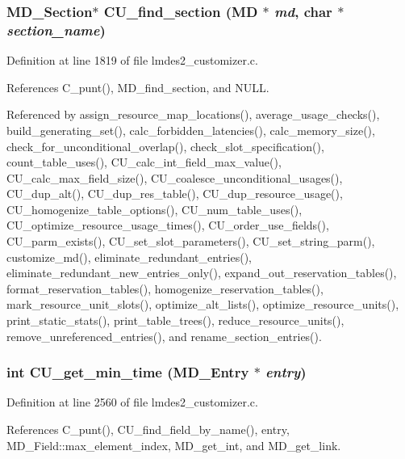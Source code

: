 \subsubsection{\setlength{\rightskip}{0pt plus 5cm}\bf{MD\_\-Section}$\ast$ CU\_\-find\_\-section (\bf{MD} $\ast$ {\em md}, char $\ast$ {\em section\_\-name})}\label{lmdes2__customizer_8c_5b29c261eac5c2802f9c5ef741c7ef12}




Definition at line 1819 of file lmdes2\_\-customizer.c.

References C\_\-punt(), MD\_\-find\_\-section, and NULL.

Referenced by assign\_\-resource\_\-map\_\-locations(), average\_\-usage\_\-checks(), build\_\-generating\_\-set(), calc\_\-forbidden\_\-latencies(), calc\_\-memory\_\-size(), check\_\-for\_\-unconditional\_\-overlap(), check\_\-slot\_\-specification(), count\_\-table\_\-uses(), CU\_\-calc\_\-int\_\-field\_\-max\_\-value(), CU\_\-calc\_\-max\_\-field\_\-size(), CU\_\-coalesce\_\-unconditional\_\-usages(), CU\_\-dup\_\-alt(), CU\_\-dup\_\-res\_\-table(), CU\_\-dup\_\-resource\_\-usage(), CU\_\-homogenize\_\-table\_\-options(), CU\_\-num\_\-table\_\-uses(), CU\_\-optimize\_\-resource\_\-usage\_\-times(), CU\_\-order\_\-use\_\-fields(), CU\_\-parm\_\-exists(), CU\_\-set\_\-slot\_\-parameters(), CU\_\-set\_\-string\_\-parm(), customize\_\-md(), eliminate\_\-redundant\_\-entries(), eliminate\_\-redundant\_\-new\_\-entries\_\-only(), expand\_\-out\_\-reservation\_\-tables(), format\_\-reservation\_\-tables(), homogenize\_\-reservation\_\-tables(), mark\_\-resource\_\-unit\_\-slots(), optimize\_\-alt\_\-lists(), optimize\_\-resource\_\-units(), print\_\-static\_\-stats(), print\_\-table\_\-trees(), reduce\_\-resource\_\-units(), remove\_\-unreferenced\_\-entries(), and rename\_\-section\_\-entries().
\subsubsection{\setlength{\rightskip}{0pt plus 5cm}int CU\_\-get\_\-min\_\-time (\bf{MD\_\-Entry} $\ast$ {\em entry})}\label{lmdes2__customizer_8c_04c8d543fffa447091d73d185e5e6765}




Definition at line 2560 of file lmdes2\_\-customizer.c.

References C\_\-punt(), CU\_\-find\_\-field\_\-by\_\-name(), entry, MD\_\-Field::max\_\-element\_\-index, MD\_\-get\_\-int, and MD\_\-get\_\-link.

